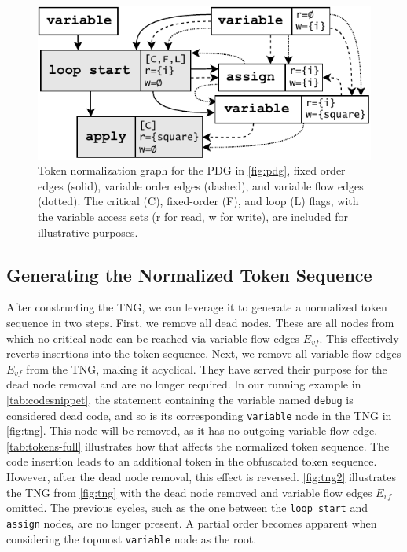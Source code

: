 \begin{figure}
\centering
\includegraphics[width=0.6\linewidth]{figures/tng3.pdf}
\caption[Token Normalization Graph]{Token normalization graph for the PDG in \autoref{fig:pdg}, fixed order edges (solid), variable order edges (dashed), and variable flow edges (dotted).
The critical (C), fixed-order (F), and loop (L) flags, with the variable access sets (r for read, w for write), are included for illustrative purposes.}
\label{fig:tng}
\end{figure}


\subsection{Generating the Normalized Token Sequence}

After constructing the TNG, we can leverage it to generate a normalized token sequence in two steps.
First, we remove all dead nodes. These are all nodes from which no critical node can be reached via variable flow edges $E_{vf}$. This effectively reverts insertions into the token sequence.
Next, we remove all variable flow edges $E_{vf}$ from the TNG, making it acyclical. They have served their purpose for the dead node removal and are no longer required.
In our running example in \autoref{tab:codesnippet}, the statement containing the variable named \texttt{debug} is considered dead code, and so is its corresponding \texttt{variable} node in the TNG in \autoref{fig:tng}.
This node will be removed, as it has no outgoing variable flow edge.
\autoref{tab:tokens-full} illustrates how that affects the normalized token sequence. The code insertion leads to an additional token in the obfuscated token sequence. However, after the dead node removal, this effect is reversed.
\autoref{fig:tng2} illustrates the TNG from \autoref{fig:tng} with the dead node removed and variable flow edges $E_{vf}$ omitted. The previous cycles, such as the one between the \texttt{loop start} and \texttt{assign} nodes, are no longer present.
A partial order becomes apparent when considering the topmost \texttt{variable} node as the root.

